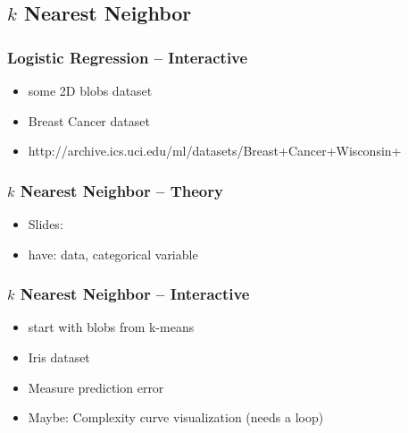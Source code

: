 \documentclass[english,final,compress]{beamer}
\begin{document}
\subsection{$k$ Nearest Neighbor}

\begin{frame}
    \frametitle{Logistic Regression -- Interactive}
    \begin{itemize}
        \item some 2D blobs dataset
        \item  Breast Cancer dataset
        \item  http://archive.ics.uci.edu/ml/datasets/Breast+Cancer+Wisconsin+%
    \end{itemize}
\end{frame}

\begin{frame}
    \frametitle{$k$ Nearest Neighbor -- Theory}
    \begin{itemize}
        \item Slides:
        \item  have: data, categorical variable
    \end{itemize}
\end{frame}

\begin{frame}
    \frametitle{$k$ Nearest Neighbor -- Interactive}
    \begin{itemize}
        \item  start with blobs from k-means
        \item  Iris dataset
        \item  Measure prediction error
        \item  Maybe: Complexity curve visualization (needs a loop)
    \end{itemize}
\end{frame}
\end{document}
